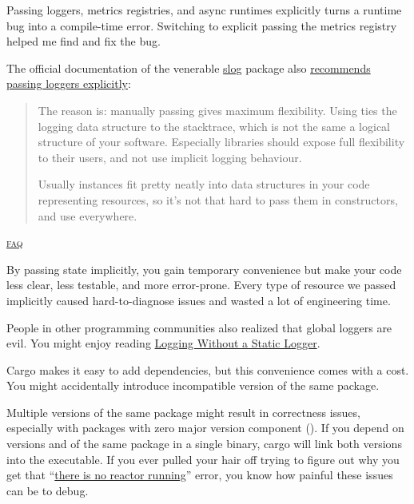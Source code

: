 \documentclass{article}
\begin{document}
Passing loggers, metrics registries, and async runtimes explicitly turns a runtime bug into a compile-time error.
Switching to explicit passing the metrics registry helped me find and fix the bug.

The official documentation of the venerable \href{https://crates.io/crates/slog}{slog} package also \href{https://github.com/slog-rs/slog/wiki/FAQ#do-i-have-to-pass-logger-around}{recommends passing loggers explicitly}:

\blockquote{
  The reason is: manually passing  gives maximum flexibility.
  Using  ties the logging data structure to the stacktrace, which is not the same a logical structure of your software.
  Especially libraries should expose full flexibility to their users, and not use implicit logging behaviour.

  Usually  instances fit pretty neatly into data structures in your code representing resources, so it's not that hard to pass them in constructors, and use  everywhere.
}{\href{https://github.com/slog-rs/slog/wiki/FAQ#do-i-have-to-pass-logger-around}{ \textsc{faq}}}

By passing state implicitly, you gain temporary convenience but make your code less clear, less testable, and more error-prone.
Every type of resource we passed implicitly caused hard-to-diagnose issues and wasted a lot of engineering time.

People in other programming communities also realized that global loggers are evil.
You might enjoy reading \href{https://www.yegor256.com/2019/03/19/logging-without-static-logger.html}{Logging Without a Static Logger}.


Cargo makes it easy to add dependencies, but this convenience comes with a cost.
You might accidentally introduce incompatible version of the same package.

Multiple versions of the same package might result in correctness issues, especially with packages with zero major version component ().
If you depend on versions  and  of the same package in a single binary, cargo will link both versions into the executable.
If you ever pulled your hair off trying to figure out why you get that ``\href{https://github.com/awslabs/aws-lambda-rust-runtime/issues/266}{there is no reactor running}'' error, you know how painful these issues can be to debug.
\end{document}
